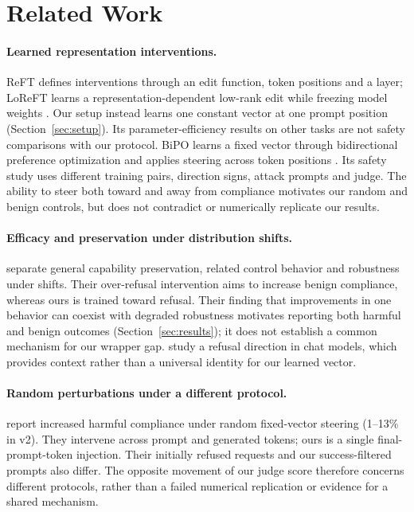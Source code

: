 \section{Related Work}
\paragraph{Learned representation interventions.} ReFT defines interventions through an edit function, token positions and a layer; LoReFT learns a representation-dependent low-rank edit while freezing model weights \citep{wu2024reft}. Our setup instead learns one constant vector at one prompt position (Section~\ref{sec:setup}). Its parameter-efficiency results on other tasks are not safety comparisons with our protocol. BiPO learns a fixed vector through bidirectional preference optimization and applies steering across token positions \citep{cao2024bipo}. Its safety study uses different training pairs, direction signs, attack prompts and judge. The ability to steer both toward and away from compliance motivates our random and benign controls, but does not contradict or numerically replicate our results.

\paragraph{Efficacy and preservation under distribution shifts.} \citet{goyal2026specificity} separate general capability preservation, related control behavior and robustness under shifts. Their over-refusal intervention aims to increase benign compliance, whereas ours is trained toward refusal. Their finding that improvements in one behavior can coexist with degraded robustness motivates reporting both harmful and benign outcomes (Section~\ref{sec:results}); it does not establish a common mechanism for our wrapper gap. \citet{arditi2024refusal} study a refusal direction in chat models, which provides context rather than a universal identity for our learned vector.

\paragraph{Random perturbations under a different protocol.} \citet{korznikov2026rogue} report increased harmful compliance under random fixed-vector steering (1--13\% in v2). They intervene across prompt and generated tokens; ours is a single final-prompt-token injection. Their initially refused requests and our success-filtered prompts also differ. The opposite movement of our judge score therefore concerns different protocols, rather than a failed numerical replication or evidence for a shared mechanism.

